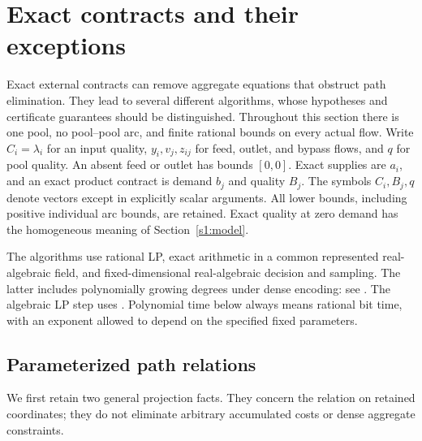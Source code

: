\section{Exact contracts and their exceptions}\label{s5:contracts}

Exact external contracts can remove aggregate equations that obstruct
path elimination. They lead to several different algorithms, whose
hypotheses and certificate guarantees should be distinguished. Throughout
this section there is one pool, no pool--pool arc, and finite rational
bounds on every actual flow. Write $C_i=\lambda_i$ for an input quality,
$y_i,v_j,z_{ij}$ for feed, outlet, and bypass flows, and $q$ for pool
quality. An absent feed or outlet has bounds $[0,0]$. Exact supplies are
$a_i$, and an exact product contract is demand $b_j$ and quality $B_j$.
The symbols $C_i,B_j,q$ denote vectors except in explicitly scalar
arguments. All lower bounds, including positive individual arc bounds,
are retained. Exact quality at zero demand has the homogeneous meaning
of Section~\ref{s1:model}.

The algorithms use rational LP, exact arithmetic in a common represented
real-algebraic field, and fixed-dimensional real-algebraic decision and
sampling. The latter includes polynomially growing degrees under dense
encoding: see \citet[Theorem~1.3.1 and Sections~3.1.3--3.2]
{basu1996-on-the-combinatorial-and-algebraic}. The algebraic LP step uses
\citet[Section~5, Remark~1]{s4:adler1994}. Polynomial time below always
means rational bit time, with an exponent allowed to depend on the
specified fixed parameters.

\subsection{Parameterized path relations}\label{s5:parameter-paths}

We first retain two general projection facts. They concern the relation
on retained coordinates; they do not eliminate arbitrary accumulated
costs or dense aggregate constraints.

